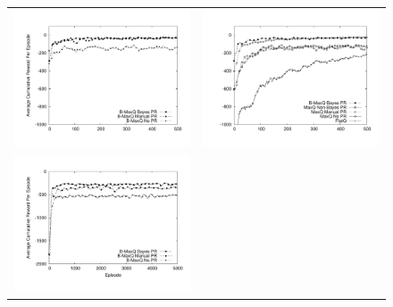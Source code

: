 \renewcommand{\arraystretch}{0}
\begin{figure}[ht]
\centering
\begin{tabular}{cc}
\includegraphics[trim=50 50 30 50, clip, scale=0.3]{exp/Taxi_Modified_b.pdf} & 
\includegraphics[trim=50 50 30 50, clip, scale=0.3]{exp/Taxi_Modified_nb.pdf} \\
\includegraphics[trim=50 50 30 50, clip, scale=0.3]{exp/Hallwayb.pdf} & 

\end{tabular}
\end{figure}

